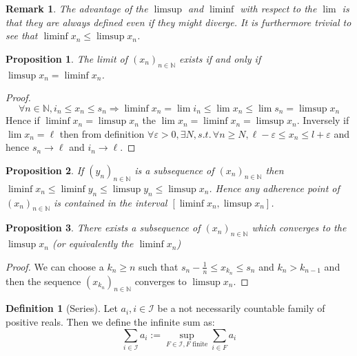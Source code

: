 \documentclass[10pt,a4paper]{book}
\newtheorem{proposition}{Proposition}[section]
\newtheorem*{remark}{Remark}
\theoremstyle{definition}
\newtheorem{definition}{Definition}[section]
\begin{document}
\begin{remark}
The advantage of the $\limsup$ and $\liminf$ with respect to the $\lim$ is that they are always defined even if they might diverge. It is furthermore trivial to see that $\liminf x_n \leq \limsup x_n$. 
\end{remark}

\begin{proposition}
The limit of $(x_n)_{n \in \mathbb{N}}$ exists if and only if $\limsup x_n = \liminf x_n$. 
\end{proposition}

\begin{proof}
\[
\forall n \in \mathbb{N}, i_n \leq x_n \leq s_n \Rightarrow \liminf x_n = \lim i_n \leq \lim x_n \leq \lim s_n = \limsup x_n
\]
Hence if $\liminf x_n = \limsup x_n$ the $\lim x_n = \liminf x_n = \limsup x_n$. Inversely if $\lim x_n = \ell$ then from definition $\forall \varepsilon > 0, \exists N, s.t.\, \forall n \geq N,  \ell - \varepsilon \leq x_n \leq l + \varepsilon$ and hence $s_n \to \ell$ and $i_n \to \ell$. 
\end{proof}

\begin{proposition}
If $(y_n)_{n \in \mathbb{N}}$ is a subsequence of $(x_n)_{n \in \mathbb{N}}$ then $\liminf x_n \leq \liminf y_n \leq \limsup y_n \leq \limsup x_n$. Hence any adherence point of $(x_n)_{n \in \mathbb{N}}$ is contained in the interval $[\liminf x_n, \limsup x_n]$. 
\end{proposition}

\begin{proposition}
There exists a subsequence of $(x_n)_{n \in \mathbb{N}}$ which converges to the $\limsup x_n$ (or equivalently the $\liminf x_n$)
\end{proposition}

\begin{proof}

We can choose a $k_n \geq n$ such that $s_n - \frac{1}{n} \leq x_{k_n} \leq s_n$ and $k_n > k_{n-1}$ and then the sequence $(x_{k_n})_{n \in \mathbb{N}}$ converges to $\limsup x_n$. 

\end{proof}

\begin{definition}[Series]

Let $a_i, i \in \mathcal{I}$ be a not necessarily countable family of positive reals. Then we define the infinite sum as:
\[
\sum_{i \in \mathcal{I}} a_i := \sup_{F \in \mathcal{I}, F \text{ finite}} \sum_{i \in F} a_i
\]

\end{definition}
\end{document}
